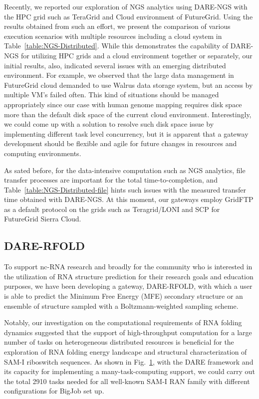 \documentclass{sig-alternate}
\begin{document}
\begin{figure}
  \label{fig:dare-rfold-result} 
\end{figure}

Recently, we reported our exploration of NGS analytics using DARE-NGS with the HPC grid such as TeraGrid and
Cloud environment of FutureGrid\cite{ecmls11}.  Using the results obtained from such an effort, we present the comparison of various execution scenarios with multiple resources including a cloud system in Table~\ref{table:NGS-Distributed}.  While this demonstrates the capability of DARE-NGS for utilizing HPC grids and a cloud environment together or separately, our initial results, also, indicated several issues with an emerging distributed environment.  For example,  we observed that the large data management in FutureGrid cloud demanded to use Walrus data storage system, but an access by multiple VM's failed often.  This kind of situations should be managed appropriately since our case with human genome mapping requires disk space more than the default disk space of the current cloud environment. Interestingly, we could come up with a solution to resolve such disk space issue by implementing different task level concurrency, but it is apparent that a gateway development should be flexible and agile for future changes in resources and computing environments.  

As sated before, for the data-intensive computation such as NGS analytics, file transfer processes are important for the total time-to-completion, and Table~\ref{table:NGS-Distributed-file} hints such issues with the measured transfer time obtained with DARE-NGS.  At this moment, our gateways employ GridFTP as a default protocol on the grids such as Teragrid/LONI and SCP for FutureGrid Sierra Cloud.

\subsection{DARE-RFOLD}
To support nc-RNA research and broadly for the community who is interested in the utilization of RNA structure prediction for their research goals and education purposes, we have been developing a gateway, DARE-RFOLD, with which a user is able to predict the Minimum Free Energy (MFE) secondary structure or an ensemble of structure sampled with a Boltzmann-weighted sampling scheme.  

Notably, our investigation on the computational requirements of RNA folding dynamics suggested that the support of high-throughput computation for a large number of tasks on heterogeneous distributed resources is beneficial for the exploration of RNA folding energy landscape and structural characterization of SAM-I riboswitch sequences.  As shown in Fig.~\ref{fig:dare-rfold-result}, with the DARE framework and its capacity for implementing a many-task-computing support, we could carry out the total 2910 tasks needed for all well-known SAM-I RAN family with different configurations for BigJob set up\cite{ecmls10}. 
\end{document}
